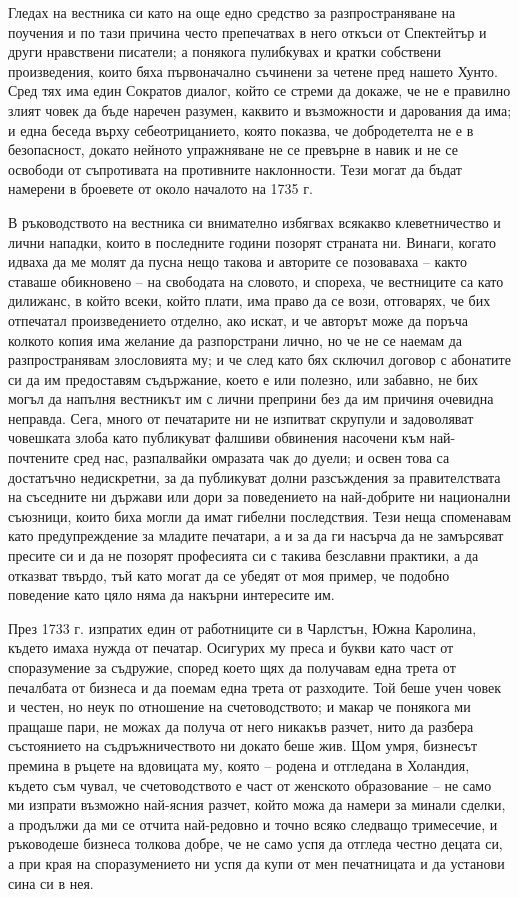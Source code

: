 \documentclass[12pt]{book}
\begin{document}
Гледах на вестника си като на още едно средство за разпространяване на поучения и по тази причина често препечатвах в него откъси от Спектейтър и други нравствени писатели; а понякога пулибкувах и кратки собствени произведения, които бяха първоначално съчинени за четене пред нашето Хунто. Сред тях има един Сократов диалог, който се стреми да докаже, че не е правилно злият човек да бъде наречен разумен, каквито и възможности и дарования да има; и една беседа върху себеотрицанието, която показва, че добродетелта не е в безопасност, докато нейното упражняване не се превърне в навик и не се освободи от съпротивата на противните наклонности. Тези могат да бъдат намерени в броевете от около началото на 1735 г.

В ръководството на вестника си внимателно избягвах всякакво клеветничество и лични нападки, които в последните години позорят страната ни. Винаги, когато идваха да ме молят да пусна нещо такова и авторите се позоваваха – както ставаше обикновено – на свободата на словото, и спореха, че вестниците са като дилижанс, в който всеки, който плати, има право да се вози, отговарях, че бих отпечатал произведението отделно, ако искат, и че авторът може да поръча колкото копия има желание да разпорстрани лично, но че не се наемам да разпространявам злословията му; и че след като бях сключил договор с абонатите си да им предоставям съдържание, което е или полезно, или забавно, не бих могъл да напълня вестникът им с лични преприни без да им причиня очевидна неправда. Сега, много от печатарите ни не изпитват скрупули и задоволяват човешката злоба като публикуват фалшиви обвинения насочени към най-почтените сред нас, разпалвайки омразата чак до дуели; и освен това са достатъчно недискретни, за да публикуват долни разсъждения за правителствата на съседните ни държави или дори за поведението на най-добрите ни национални съюзници, които биха могли да имат гибелни последствия. Тези неща споменавам като предупреждение за младите печатари, а и за да ги насърча да не замърсяват пресите си и да не позорят професията си с такива безславни практики, а да отказват твърдо, тъй като могат да се убедят от моя пример, че подобно поведение като цяло няма да накърни интересите им.

През 1733 г. изпратих един от работниците си в Чарлстън, Южна Каролина, където имаха нужда от печатар. Осигурих му преса и букви като част от споразумение за съдружие, според което щях да получавам една трета от печалбата от бизнеса и да поемам една трета от разходите. Той беше учен човек и честен, но неук по отношение на счетоводството; и макар че понякога ми пращаше пари, не можах да получа от него никакъв разчет, нито да разбера състоянието на съдръжничеството ни докато беше жив. Щом умря, бизнесът премина в ръцете на вдовицата му, която – родена и отгледана в Холандия, където съм чувал, че счетоводството е част от женското образование – не само ми изпрати възможно най-ясния разчет, който можа да намери за минали сделки, а продължи да ми се отчита най-редовно и точно всяко следващо тримесечие, и ръководеше бизнеса толкова добре, че не само успя да отгледа честно децата си, а при края на споразумението ни успя да купи от мен печатницата и да установи сина си в нея. 
\end{document}
